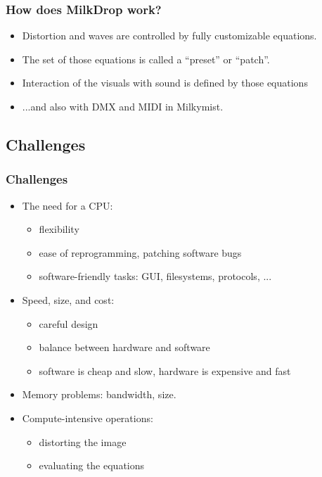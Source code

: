 \documentclass{beamer}
\begin{document}
\frame
{
  \frametitle{How does MilkDrop work?}

  \begin{itemize}
  \item Distortion and waves are controlled by fully customizable equations.
  \item The set of those equations is called a ``preset'' or ``patch''.
  \item Interaction of the visuals with sound is defined by those equations
  \item ...and also with DMX and MIDI in Milkymist.
  \end{itemize}
}

\subsection{Challenges}
\frame
{
  \frametitle{Challenges}

  \begin{itemize}
  \item The need for a CPU:
  \begin{itemize}
     \item flexibility
     \item ease of reprogramming, patching software bugs
     \item software-friendly tasks: GUI, filesystems, protocols, ...
  \end{itemize}
  \item Speed, size, and cost:
  \begin{itemize}
     \item careful design
     \item balance between hardware and software
     \item software is cheap and slow, hardware is expensive and fast
  \end{itemize}
  \item Memory problems: bandwidth, size.
  \item Compute-intensive operations:
  \begin{itemize}
     \item distorting the image
     \item evaluating the equations
  \end{itemize}
  \end{itemize}
}
\end{document}
